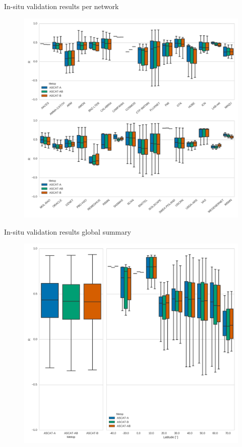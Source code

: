 \documentclass[10pt,ignorenonframetext,xcolor={dvipsnames, table}]{beamer}
\begin{document}
\begin{frame}{In-situ validation results per network}

\begin{figure}
\includegraphics[height=0.8\textheight,keepaspectratio]{./figures/boxplot_ISMNnetwork_ASCAT.png}
\end{figure}

\end{frame}

\begin{frame}{In-situ validation results global summary}

\begin{figure}
\includegraphics[height=0.8\textheight,keepaspectratio]{./figures/boxplot_ISMN_ASCAT_all_latitude.png}
\end{figure}

\end{frame}
\end{document}
